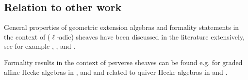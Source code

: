 \documentclass{amsart}
\theoremstyle{plain}
\theoremstyle{TheoremNum}
\theoremstyle{definition}
\theoremstyle{remark}
\numberwithin{equation}{section}
\begin{document}
\subsection*{Relation to other work}
\begin{enumerate*}
%
%
\item 
General properties of geometric extension algebras and formality statements 
in the context of ($\ell$-adic) sheaves
have been discussed in the literature extensively, see for example \cite{sauter_survey_2013}, \cite{kato_algebraic_2017}, 
 \cite{mcnamara_representation_2020} and \cite{polishchuk_semiorthogonal_2019}.
 \\
 \item Formality results in the context of perverse sheaves can be found e.g. for graded affine Hecke algebras in \cite{rider_formality_2013},  \cite{rider_perverse_2016} and \cite{rider_formality_2021} and related to quiver Hecke algebras in \cite{mcnamara_monoidality_2017} and \cite{webster_weighted_2019}.
 \\






\end{enumerate*}

\end{document}
